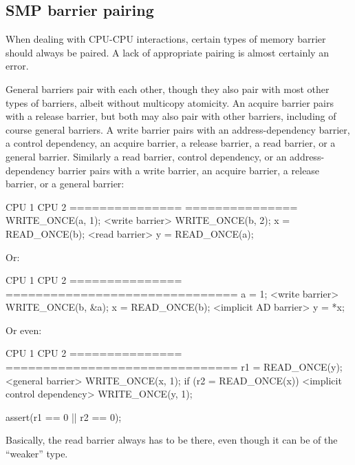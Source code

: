 \subsection{SMP barrier pairing}
\label{sec:SMP barrier pairing}

When dealing with CPU-CPU interactions, certain types of memory barrier should
always be paired.
A lack of appropriate pairing is almost certainly an error.

General barriers pair with each other, though they also pair with most
other types of barriers, albeit without multicopy atomicity.
An acquire barrier pairs with a release barrier, but both may also pair
with other barriers, including of course general barriers.
A write barrier pairs with an address-dependency barrier,
a control dependency, an acquire barrier, a release barrier,
a read barrier, or a general barrier.
Similarly a read barrier, control dependency, or
an address-dependency barrier pairs with a write barrier,
an acquire barrier, a release barrier, or a general barrier:

\begin{VerbatimU}
	CPU 1                 CPU 2
	===============       ===============
	WRITE_ONCE(a, 1);
	<write barrier>
	WRITE_ONCE(b, 2);     x = READ_ONCE(b);
	                      <read barrier>
	                      y = READ_ONCE(a);
\end{VerbatimU}

Or:

\begin{VerbatimU}
	CPU 1                 CPU 2
	===============	      ===============================
	a = 1;
	<write barrier>
	WRITE_ONCE(b, &a);    x = READ_ONCE(b);
	                      <implicit AD barrier>
	                      y = *x;
\end{VerbatimU}

Or even:

\begin{VerbatimU}
	CPU 1                 CPU 2
	===============	      ===============================
	r1 = READ_ONCE(y);
	<general barrier>
	WRITE_ONCE(x, 1);     if (r2 = READ_ONCE(x)) {
	                      <implicit control dependency>
	                          WRITE_ONCE(y, 1);
	                      }

	assert(r1 == 0 || r2 == 0);
\end{VerbatimU}

Basically, the read barrier always has to be there, even though it can be of
the ``weaker'' type.

